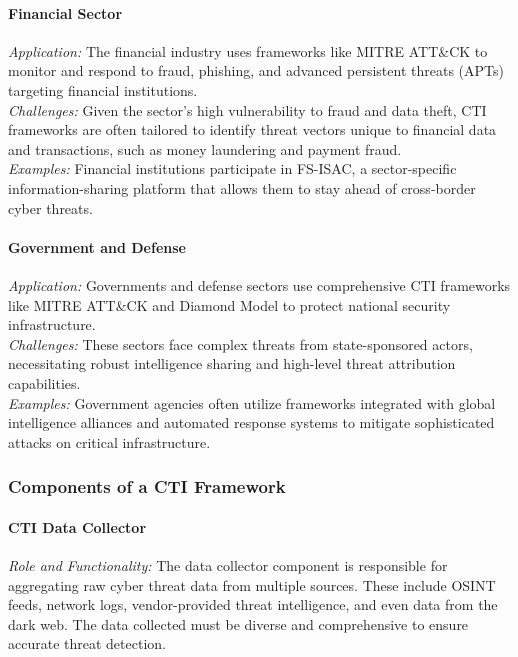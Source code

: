 \documentclass[a4paper,twoside,12pt]{report}
\begin{document}
\paragraph{Financial Sector \citet{bin2024maximizing}}
\textit{Application:} The financial industry uses frameworks like MITRE ATT\&CK to monitor and respond to fraud, phishing, and advanced persistent threats (APTs) targeting financial institutions. \\
\textit{Challenges:} Given the sector's high vulnerability to fraud and data theft, CTI frameworks are often tailored to identify threat vectors unique to financial data and transactions, such as money laundering and payment fraud. \\
\textit{Examples:} Financial institutions participate in FS-ISAC, a sector-specific information-sharing platform that allows them to stay ahead of cross-border cyber threats.

\paragraph{Government and Defense \citet{bin2024maximizing}}
\textit{Application:} Governments and defense sectors use comprehensive CTI frameworks like MITRE ATT\&CK and Diamond Model to protect national security infrastructure. \\
\textit{Challenges:} These sectors face complex threats from state-sponsored actors, necessitating robust intelligence sharing and high-level threat attribution capabilities. \\
\textit{Examples:} Government agencies often utilize frameworks integrated with global intelligence alliances and automated response systems to mitigate sophisticated attacks on critical infrastructure.

\subsubsection*{Components of a CTI Framework}
\paragraph{CTI Data Collector}
\textit{Role and Functionality:} The data collector component is responsible for aggregating raw cyber threat data from multiple sources. These include OSINT feeds, network logs, vendor-provided threat intelligence, and even data from the dark web. The data collected must be diverse and comprehensive to ensure accurate threat detection.
\end{document}
